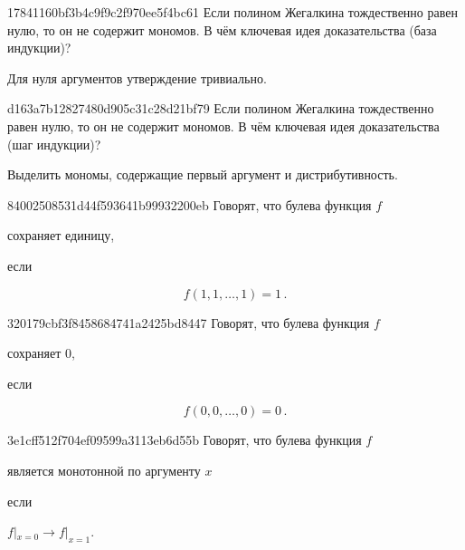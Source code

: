 \begin{note}{17841160bf3b4c9f9c2f970ee5f4bc61}
    Если полином Жегалкина тождественно равен нулю, то он не содержит мономов.
    В чём ключевая идея доказательства (база индукции)?

    \begin{cloze}{1}
        Для нуля аргументов утверждение тривиально.
    \end{cloze}
\end{note}

\begin{note}{d163a7b12827480d905c31c28d21bf79}
    Если полином Жегалкина тождественно равен нулю, то он не содержит мономов.
    В чём ключевая идея доказательства (шаг индукции)?

    \begin{cloze}{1}
        Выделить мономы, содержащие первый аргумент и дистрибутивность.
    \end{cloze}
\end{note}

\begin{note}{84002508531d44f593641b99932200eb}
    Говорят, что булева функция \({ f }\) \begin{icloze}{2}сохраняет единицу,\end{icloze} если
    \begin{icloze}{1}
        \[
            f(1, 1, \ldots, 1) = 1\,.
        \]
    \end{icloze}
\end{note}

\begin{note}{320179cbf3f8458684741a2425bd8447}
    Говорят, что булева функция \({ f }\) \begin{icloze}{2}сохраняет 0,\end{icloze} если
    \begin{icloze}{1}
        \[
            f(0, 0, \ldots, 0) = 0\,.
        \]
    \end{icloze}
\end{note}

\begin{note}{3e1cff512f704ef09599a3113eb6d55b}
    Говорят, что булева функция \({ f }\) \begin{icloze}{2}является монотонной по аргументу \({ x }\)\end{icloze} если
    \begin{icloze}{1}
        \({ f|_{x=0} \to f|_{x=1} }\).
    \end{icloze}
\end{note}

